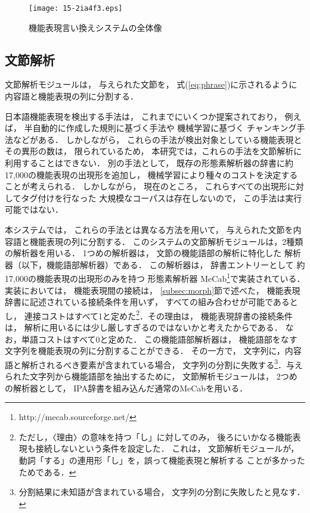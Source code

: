 \documentclass[japanese]{jnlp_1.4}
\begin{document}
\begin{figure}[b]
\begin{center}
\texttt{[image: 15-2ia4f3.eps]}
\caption{機能表現言い換えシステムの全体像}
\label{fig:system}
\end{center}
\end{figure}



\subsection{文節解析}

文節解析モジュールは，
与えられた文節を，
式(\ref{eq:phrase})に示されるように
内容語と機能表現の列に分割する．

日本語機能表現を検出する手法は，
これまでにいくつか提案されており，
例えば，
半自動的に作成した規則に基づく手法や
機械学習に基づく
チャンキング手法などがある．
しかしながら，
これらの手法が検出対象としている機能表現とその異形の数は，
限られているため，
本研究では，これらの手法を文節解析に利用することはできない．
別の手法として，
既存の形態素解析器の辞書に約17,000の機能表現の出現形を追加し，
機械学習により種々のコストを決定することが考えられる．
しかしながら，
現在のところ，
これらすべての出現形に対してタグ付けを行なった
大規模なコーパスは存在しないので，
この手法は実行可能ではない．

本システムでは，
これらの手法とは異なる方法を用いて，
与えられた文節を内容語と機能表現の列に分割する．
このシステムの文節解析モジュールは，2種類の解析器を用いる．
1つめの解析器は，
文節の機能語部の解析に特化した
解析器（以下，機能語部解析器）である．
この解析器は，
辞書エントリーとして
約17,000の機能表現の出現形のみを持つ
形態素解析器 MeCab\footnote{
	http://mecab.sourceforge.net/
}で実装されている．
実装においては，
機能表現間の接続は，
\ref{subsec:morph}節で述べた，
機能表現辞書に記述されている接続条件を用いず，
すべての組み合わせが可能であるとし，
連接コストはすべて1と定めた\footnote{
	ただし，〈理由〉の意味を持つ「し」に対してのみ，
	後ろにいかなる機能表現も接続しないという条件を設定した．
	これは，
	文節解析モジュールが，
	動詞「する」の連用形「し」を，誤って機能表現と解析する
	ことが多かったためである．
}．その理由は，
機能表現辞書の接続条件は，
解析に用いるには少し厳しすぎるのではないかと考えたからである．
なお，単語コストはすべて0と定めた．
この機能語部解析器は，
機能語部をなす文字列を機能表現の列に分割することができる．
その一方で，
文字列に，内容語と解析されるべき要素が含まれている場合，
文字列の分割に失敗する\footnote{
	分割結果に未知語が含まれている場合，
	文字列の分割に失敗したと見なす．
}．与えられた文字列から機能語部を抽出するために，
文節解析モジュールは，
2つめの解析器として，
IPA辞書を組み込んだ通常のMeCabを用いる．
\end{document}
